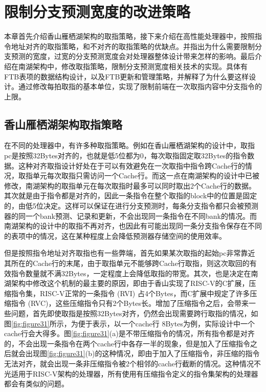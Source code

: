 \chapter{限制分支预测宽度的改进策略}

本章首先介绍香山雁栖湖架构的取指策略，接下来介绍在高性能处理器中，按照指令地址对齐的取指策略，和不对齐的取指策略的优缺点。并指出为什么需要限制分支预测的宽度，过宽的分支预测宽度会对处理器整体设计带来怎样的影响。最后介绍在南湖架构中，修改取指策略，限制分支预测宽度相关技术的实现。具体有FTB表项的数据结构设计，以及FTB更新和管理策略，并解释了为什么要这样设计。通过修改每拍取指的基本单位，实现了限制前端在一次取指内容中分支指令的上限。

\section{香山雁栖湖架构取指策略}

在不同的处理器中，有许多种取指策略。例如在香山雁栖湖架构的设计中，取指pc是按照32Bytes对齐的，也就是低5位都为0，每次取指固定取32Bytes的指令数据。这种对齐取指设计好处在于可以有效避免在一次取指中指令跨Cache行的情况，取指单元每次取指只需访问一个Cache行。而这一点在南湖架构的设计中已被修改，南湖架构的取指单元在每次取指时最多可以同时取出2个Cache行的数据。其次就是由于指令都是对齐的，因此一条指令在整个取指的block中的位置是固定的，由低5位决定。这样可以保证在进行分支预测时，每条分支指令都只会被预测器的同一个bank预测、记录和更新，不会出现同一条指令在不同bank的情况。而南湖架构的设计中的取指不再对齐，也因此有可能出现同一条分支指令保存在不同的表项中的情况，这在某种程度上会降低预测器存储空间的使用效率。

但是按照指令地址对齐取指也有一些弊端，首先如果某次取指的起始pc非常靠近其所在的Cache行的末尾，由于取指单元不能够跨Cache行取指，则这次取回的有效指令数量就不满32Bytes，一定程度上会降低取指的带宽。其次，也是决定在南湖架构中修改这个机制的最主要的原因，即由于香山实现了RISC-V的C扩展，压缩指令集，RISC-V正常的一条指令 (RVI) 占4个Bytes，而C扩展中规定了许多压缩指令 (RVC)，这些压缩指令只有2个Bytes长。增加了压缩指令之后，会带来一些问题，首先即使取指是按照32Bytes对齐，仍然会出现需要跨行取指的情况，如图\ref{fig:figure31}所示，为便于表示，以一个cache行 8Bytes为例，实际设计中一个cache行会大得多。图\ref{fig:figure31}(a)是不带压缩指令的情况，所有指令都是对齐的，不会出现一条指令在两个cache行中各存一半的现象，但是加入了压缩指令之后就会出现图\ref{fig:figure31}(b)的这种情况，即由于加入了压缩指令，非压缩的指令无法对齐，就会出现一条非压缩指令被2个相邻的cache行截断的情况。这种情况不光适用于RISC-V架构的处理器，所有使用有压缩指令定义的指令集架构的处理器都会有类似的问题。

